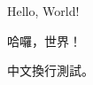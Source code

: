 \documentclass[a4paper,twocolumn]{article}
\begin{document}
Hello, World!

哈囉，世界！

中文換行測試。
\end{document}
